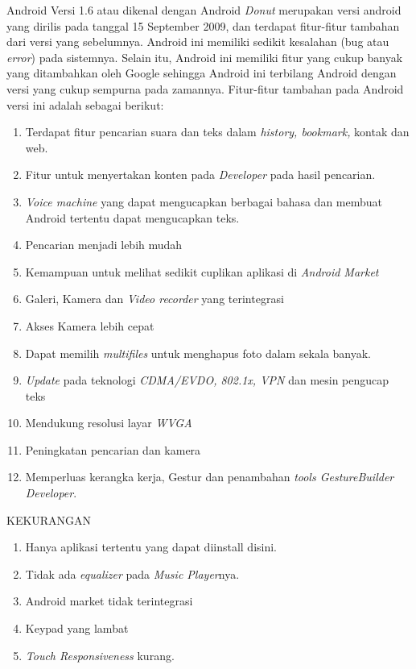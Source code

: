 \begin{enumerate}
Android Versi 1.6 atau dikenal dengan Android \textit{Donut} merupakan versi android yang dirilis pada tanggal 15 September 2009, dan terdapat fitur-fitur tambahan dari versi yang sebelumnya. Android ini memiliki sedikit kesalahan (bug atau \textit{error}) pada sistemnya. Selain itu, Android ini memiliki fitur yang cukup banyak yang ditambahkan oleh Google sehingga Android ini terbilang Android dengan versi yang cukup sempurna pada zamannya. Fitur-fitur tambahan pada Android versi ini adalah sebagai berikut:
\begin{enumerate}
    \item Terdapat fitur pencarian suara dan teks dalam \textit{history, bookmark,} kontak dan web.
    \item Fitur untuk menyertakan konten pada \textit{Developer} pada hasil pencarian.
    \item \textit{Voice machine} yang dapat mengucapkan berbagai bahasa dan membuat Android tertentu dapat mengucapkan teks.
    \item Pencarian menjadi lebih mudah
    \item Kemampuan untuk melihat sedikit cuplikan aplikasi di \textit{Android Market}
    \item Galeri, Kamera dan \textit{Video recorder} yang terintegrasi
    \item Akses Kamera lebih cepat
    \item Dapat memilih \textit{multifiles} untuk menghapus foto dalam sekala banyak.
    \item \textit{Update} pada teknologi \textit{CDMA/EVDO, 802.1x, VPN} dan mesin pengucap teks
    \item Mendukung resolusi layar \textit{WVGA}
    \item Peningkatan pencarian dan kamera
    \item Memperluas kerangka kerja, Gestur dan penambahan \textit{tools GestureBuilder Developer}.\\
\end{enumerate}

KEKURANGAN
\begin{enumerate}
    \item Hanya aplikasi tertentu yang dapat diinstall disini.
    \item Tidak ada \textit{equalizer} pada \textit{Music Player}nya.
    \item Android market tidak terintegrasi
    \item Keypad yang lambat
    \item \textit{Touch Responsiveness} kurang.\\
\end{enumerate}



\end{enumerate}
